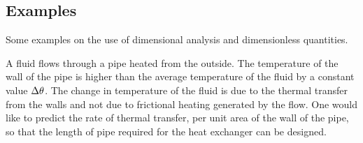 \subsection{Examples}
Some examples on the use of dimensional analysis and dimensionless quantities.

\begin{example}
A fluid flows through a pipe heated from the outside. The temperature of the wall of the pipe is higher than the average temperature of the fluid by a constant value $\Delta\theta$. The change in temperature of the fluid is due to the thermal transfer from the walls and not due to frictional heating generated by the flow. One would like to predict the rate of thermal transfer, per unit area of the wall of the pipe, so that the length of pipe required for the heat exchanger can be designed.
\end{example}

